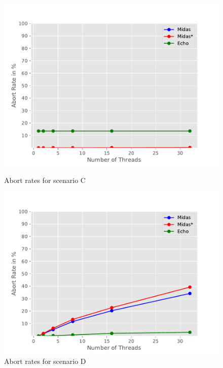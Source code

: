 \begin{figure}
\begin{minipage}[l]{0.50\textwidth}
        \includegraphics[width=\textwidth]{figures/bench/ar-ls}
        \caption{Abort rates for scenario C}
\end{minipage}
\begin{minipage}[l]{0.50\textwidth}
        \includegraphics[width=\textwidth]{figures/bench/ar-ll}
        \caption{Abort rates for scenario D}
\end{minipage}
\end{figure}
